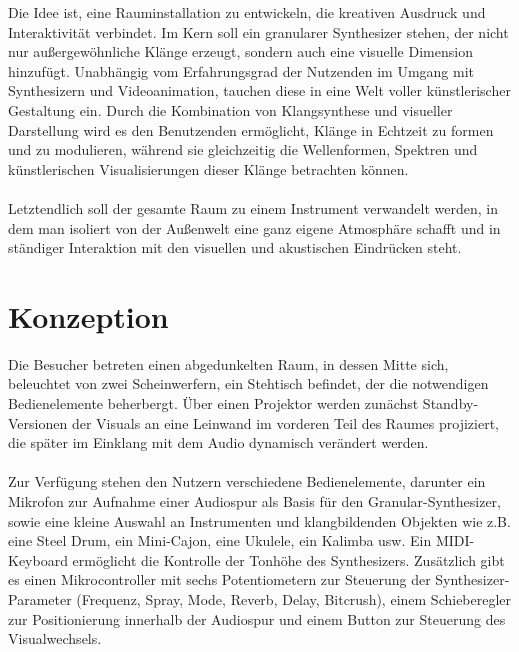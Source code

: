 \documentclass[12pt]{scrartcl}%
\theoremstyle{nonumberplain}
\begin{document}
\noindent Die Idee ist, eine Rauminstallation zu entwickeln, die kreativen Ausdruck und Interaktivität verbindet. Im Kern soll ein granularer Synthesizer stehen, der nicht nur außergewöhnliche Klänge erzeugt, sondern auch eine visuelle Dimension hinzufügt. Unabhängig vom Erfahrungsgrad der Nutzenden im Umgang mit Synthesizern und Videoanimation, tauchen diese in eine Welt voller künstlerischer Gestaltung ein. Durch die Kombination von Klangsynthese und visueller Darstellung wird es den Benutzenden ermöglicht, Klänge in Echtzeit zu formen und zu modulieren, während sie gleichzeitig die Wellenformen, Spektren und künstlerischen Visualisierungen dieser Klänge betrachten können.\\\\
Letztendlich soll der gesamte Raum zu einem Instrument verwandelt werden, in dem man isoliert von der Außenwelt eine ganz eigene Atmosphäre schafft und in ständiger Interaktion mit den visuellen und akustischen Eindrücken steht.


\newpage

\section{Konzeption}

Die Besucher betreten einen abgedunkelten Raum, in dessen Mitte sich, beleuchtet von zwei Scheinwerfern, ein Stehtisch befindet, der die notwendigen Bedienelemente beherbergt. Über einen Projektor werden zunächst Standby-Versionen der Visuals an eine Leinwand im vorderen Teil des Raumes projiziert, die später im Einklang mit dem Audio dynamisch verändert werden.
\\\\
Zur Verfügung stehen den Nutzern verschiedene Bedienelemente, darunter ein Mikrofon zur Aufnahme einer Audiospur als Basis für den Granular-Synthesizer, sowie eine kleine Auswahl an Instrumenten und klangbildenden Objekten wie z.B. eine Steel Drum, ein Mini-Cajon, eine Ukulele, ein Kalimba usw. Ein MIDI-Keyboard ermöglicht die Kontrolle der Tonhöhe des Synthesizers. Zusätzlich gibt es einen Mikrocontroller mit sechs Potentiometern zur Steuerung der Synthesizer-Parameter (Frequenz, Spray, Mode, Reverb, Delay, Bitcrush), einem Schieberegler zur Positionierung innerhalb der Audiospur und einem Button zur Steuerung des Visualwechsels.
\\\\
\end{document}
